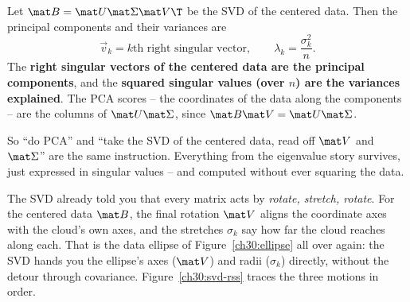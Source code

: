 \begin{formalbox}\label{ch30:pca-svd}
Let $\mat B=\mat U\mat\Sigma\mat V\T$ be the SVD of the centered data. Then the
principal components and their variances are
\[
  \boxed{\;\vec v_k = \text{$k$th right singular vector},
  \qquad
  \lambda_k=\frac{\sigma_k^2}{n}.\;}
\]
The \textbf{right singular vectors of the centered data are the principal
components}, and the \textbf{squared singular values (over $n$) are the variances
explained}. The PCA scores -- the coordinates of the data along the components --
are the columns of $\mat U\mat\Sigma$, since $\mat B\mat V=\mat U\mat\Sigma$.
\end{formalbox}

So ``do PCA'' and ``take the SVD of the centered data, read off $\mat V$ and
$\mat\Sigma$'' are the same instruction. Everything from the eigenvalue story
survives, just expressed in singular values -- and computed without ever squaring
the data.

\begin{intuitionbox}
The SVD already told you that every matrix acts by \emph{rotate, stretch, rotate}.
For the centered data $\mat B$, the final rotation $\mat V$ aligns the coordinate
axes with the cloud's own axes, and the stretches $\sigma_k$ say how far the cloud
reaches along each. That is the data ellipse of Figure~\ref{ch30:ellipse} all over
again: the SVD hands you the ellipse's axes ($\mat V$) and radii ($\sigma_k$)
directly, without the detour through covariance. Figure~\ref{ch30:svd-rss} traces
the three motions in order.
\end{intuitionbox}


